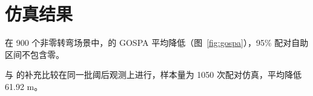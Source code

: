 \section{仿真结果}
在 900 个非零转弯场景中，\method 的 GOSPA 平均降低（图~\ref{fig:gospa}），95\% 配对自助区间不包含零。

与 \gtmethod 的补充比较在同一批阈后观测上进行，样本量为 1050 次配对仿真，平均降低 61.92 m。
